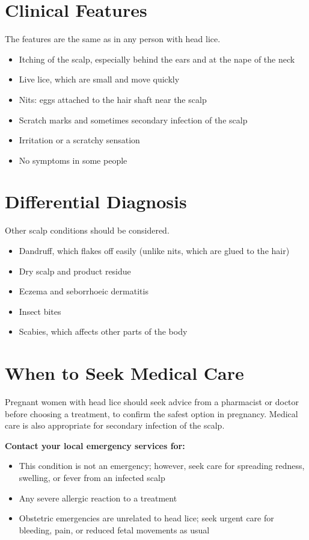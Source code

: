 \section*{Clinical Features}
The features are the same as in any person with head lice.

\begin{itemize}
    \item Itching of the scalp, especially behind the ears and at the nape of the neck
    \item Live lice, which are small and move quickly
    \item Nits: eggs attached to the hair shaft near the scalp
    \item Scratch marks and sometimes secondary infection of the scalp
    \item Irritation or a scratchy sensation
    \item No symptoms in some people
\end{itemize}

\section*{Differential Diagnosis}
Other scalp conditions should be considered.

\begin{itemize}
    \item Dandruff, which flakes off easily (unlike nits, which are glued to the hair)
    \item Dry scalp and product residue
    \item Eczema and seborrhoeic dermatitis
    \item Insect bites
    \item Scabies, which affects other parts of the body
\end{itemize}

\section*{When to Seek Medical Care}
Pregnant women with head lice should seek advice from a pharmacist or doctor before choosing a treatment, to confirm the safest option in pregnancy. Medical care is also appropriate for secondary infection of the scalp.

\textbf{Contact your local emergency services for:}
\begin{itemize}
    \item This condition is not an emergency; however, seek care for spreading redness, swelling, or fever from an infected scalp
    \item Any severe allergic reaction to a treatment
    \item Obstetric emergencies are unrelated to head lice; seek urgent care for bleeding, pain, or reduced fetal movements as usual
\end{itemize}

